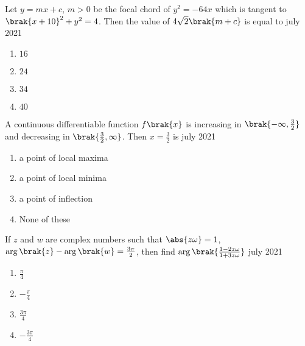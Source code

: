 \iffalse
   \title{Assignment}
   \author{EE24BTECH11034}
   \section{mcq-single}
\fi 

    \item Let $y = mx + c$, $m > 0$ be the focal chord of $y^2 = -64x$ which is tangent to $\brak{x + 10}^2 + y^2 = 4$. Then the value of $4\sqrt{2} \brak{m + c}$ is equal to \hfill{july 2021}
    
        \begin{multicols}{4}
        \begin{enumerate}
        \item $16$
        \item $24$
        \item $34$
        \item $40$
        \end{enumerate}    
        \end{multicols}
        
    \item A continuous differentiable function $f\brak{x}$ is increasing in $\brak{-\infty, \frac{3}{2}}$ and decreasing in $\brak{\frac{3}{2}, \infty}$. Then $x = \frac{3}{2}$ is \hfill{july 2021}
        
        \begin{enumerate}
        \item a point of local maxima
        \item a point of local minima
        \item a point of inflection
        \item None of these
        \end{enumerate}

    \item If $z$ and $w$ are complex numbers such that $\abs{z \omega} = 1$, $\arg\brak{z} - \arg\brak{w} = \frac{3\pi}{2}$, then find $\arg\brak{\frac{1 - 2z\omega}{1 + 3z\omega}}$ \hfill{july 2021}
    
        \begin{multicols}{4}
        \begin{enumerate}
        \item $\frac{\pi}{4}$
        \item $-\frac{\pi}{4}$
        \item $\frac{3\pi}{4}$
        \item $-\frac{3\pi}{4}$
        \end{enumerate}
        \end{multicols}
        
